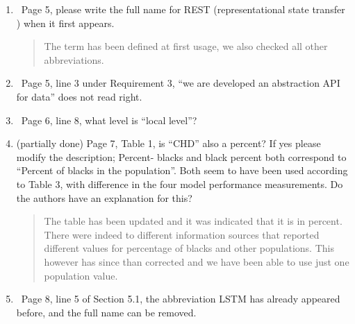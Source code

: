 \documentclass[12pt]{article}
\theoremstyle{definition}
\renewcommand{\_}{%
    \textunderscore\hspace{0pt}%
}
\newcommand{\DOIT}{{\color{red!60!black}\makebox[0pt][l]{$\square$}\raisebox{.15ex}{\hspace{0.1em}$\boxtimes}}~}
\begin{document}
\begin{enumerate}
    
\item \DOIT Page 5, please write the full name for REST (representational state transfer ) when it first appears.

\begin{quote}
    The term has been defined at first usage, we also checked all other abbreviations.


\end{quote}


\item \DOIT Page 5, line 3 under Requirement 3, “we are developed an abstraction API for data” does not read right.

\begin{quote}
\end{quote}

\item \DOIT Page 6, line 8, what level is “local level”?

\begin{quote}
\end{quote}


\item (partially done) Page 7, Table 1, is “CHD” also a percent? If yes please modify the description; Percent- blacks and black percent both correspond to “Percent of blacks in the population”. Both seem to have been used according to Table 3, with difference in the four model performance measurements. Do the authors have an explanation for this?

    \begin{quote}
    The table has been updated and it was indicated that it is in percent. There were indeed to different information sources that reported different values for percentage of blacks and other populations. This however has since than corrected and we have been able to use just one population value.

    \end{quote}


\item \DOIT Page 8, line 5 of Section 5.1, the abbreviation LSTM has already appeared before, and the full name can be removed.

    \begin{quote}
    \end{quote}


\end{enumerate}
\end{document}
